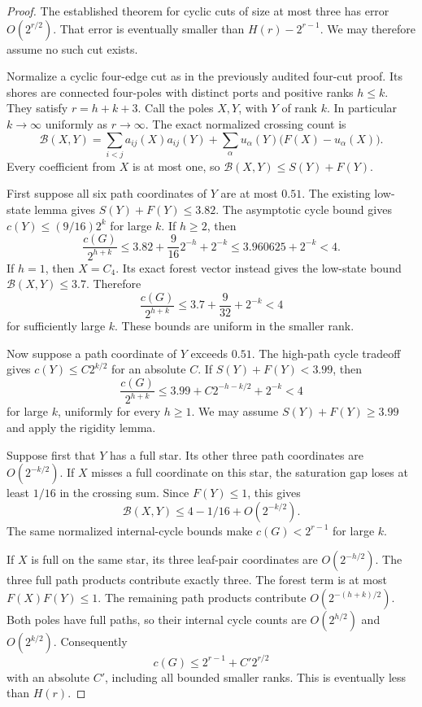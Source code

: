 \begin{proof}
The established theorem for cyclic cuts of size at most three has error $O(2^{r/2})$.
That error is eventually smaller than $H(r)-2^{r-1}$.
We may therefore assume no such cut exists.

Normalize a cyclic four-edge cut as in the previously audited four-cut proof.
Its shores are connected four-poles with distinct ports and positive ranks $h\le k$.
They satisfy $r=h+k+3$.
Call the poles $X,Y$, with $Y$ of rank $k$.
In particular $k\to\infty$ uniformly as $r\to\infty$.
The exact normalized crossing count is
\[
 \mathcal B(X,Y)
 =\sum_{i<j}a_{ij}(X)a_{ij}(Y)
  +\sum_\alpha u_\alpha(Y)\bigl(F(X)-u_\alpha(X)\bigr).
\]
Every coefficient from $X$ is at most one, so $\mathcal B(X,Y)\le S(Y)+F(Y)$.

First suppose all six path coordinates of $Y$ are at most $0.51$.
The existing low-state lemma gives $S(Y)+F(Y)\le3.82$.
The asymptotic cycle bound gives $c(Y)\le(9/16)2^k$ for large $k$.
If $h\ge2$, then
\[
 \frac{c(G)}{2^{h+k}}
 \le3.82+\frac9{16}2^{-h}+2^{-k}
 \le3.960625+2^{-k}<4.
\]
If $h=1$, then $X=C_4$.
Its exact forest vector instead gives the low-state bound $\mathcal B(X,Y)\le3.7$.
Therefore
\[
 \frac{c(G)}{2^{h+k}}
 \le3.7+\frac9{32}+2^{-k}<4
\]
for sufficiently large $k$.
These bounds are uniform in the smaller rank.

Now suppose a path coordinate of $Y$ exceeds $0.51$.
The high-path cycle tradeoff gives $c(Y)\le C2^{k/2}$ for an absolute $C$.
If $S(Y)+F(Y)<3.99$, then
\[
 \frac{c(G)}{2^{h+k}}
 \le3.99+C2^{-h-k/2}+2^{-k}<4
\]
for large $k$, uniformly for every $h\ge1$.
We may assume $S(Y)+F(Y)\ge3.99$ and apply the rigidity lemma.

Suppose first that $Y$ has a full star.
Its other three path coordinates are $O(2^{-k/2})$.
If $X$ misses a full coordinate on this star, the saturation gap loses at least $1/16$ in the crossing sum.
Since $F(Y)\le1$, this gives
\[
 \mathcal B(X,Y)\le4-1/16+O(2^{-k/2}).
\]
The same normalized internal-cycle bounds make $c(G)<2^{r-1}$ for large $k$.

If $X$ is full on the same star, its three leaf-pair coordinates are $O(2^{-h/2})$.
The three full path products contribute exactly three.
The forest term is at most $F(X)F(Y)\le1$.
The remaining path products contribute $O(2^{-(h+k)/2})$.
Both poles have full paths, so their internal cycle counts are $O(2^{h/2})$ and $O(2^{k/2})$.
Consequently
\[
 c(G)\le2^{r-1}+C'2^{r/2}
\]
with an absolute $C'$, including all bounded smaller ranks.
This is eventually less than $H(r)$.


\end{proof}
